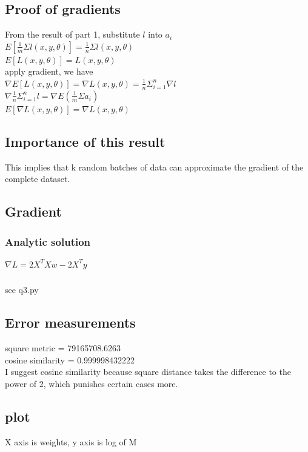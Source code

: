 \documentclass[letterpaper]{article}
\begin{document}
\subsection{Proof of gradients}
From the result of part 1,  substitute $l$ into $a_{i}$\\
$E[ \frac{1}{m} \Sigma l(x ,y,  \theta)  ] = \frac{1}{n} \Sigma l(x ,y, \theta) $\\
$E[L(x, y, \theta)] = L(x ,y, \theta)$\\
apply gradient, we have \\
$\nabla E[L(x, y, \theta)] =\nabla L(x ,y, \theta) =  \frac{1}{n} \Sigma_{i=1}^{n} \nabla l $\\
$\nabla \frac{1}{n} \Sigma_{i=1}^{n} l  = \nabla E(\frac{1}{m} \Sigma  a_{i}) $ \\
$E[ \nabla L(x, y, \theta)] = \nabla L(x, y, \theta) $

\subsection{Importance of this result}
This implies that k random batches of data can approximate the gradient of the complete dataset.

\subsection{Gradient}
\subsubsection{Analytic solution}
$\nabla L = 2X^TXw - 2X^Ty$
\subsubsection{}
see q3.py

\subsection{Error measurements}
square metric = 79165708.6263 \\
cosine similarity =  0.999998432222\\
I suggest cosine similarity because square distance takes the difference to the power of 2, which punishes certain cases more. 

 
\subsection{plot}
X axis is weights, y axis is log of M
\end{document}
